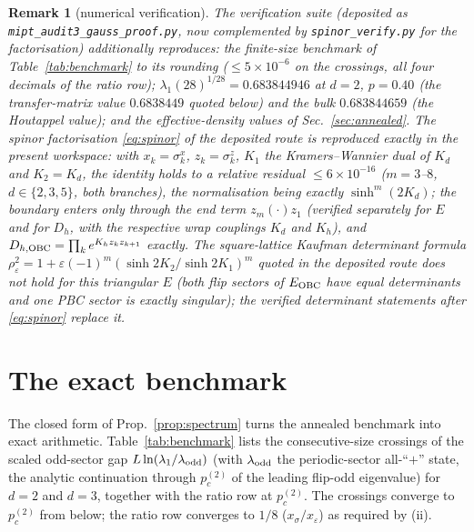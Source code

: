 \documentclass[11pt]{article}
\newtheorem{remark}{Remark}
\newcommand{\pctwo}{p_c^{(2)}}
\begin{document}
\begin{remark}[numerical verification]\label{rem:verification}
The verification suite (deposited as \texttt{mipt\_audit3\_gauss\_proof.py},
now complemented by \texttt{spinor\_verify.py} for the factorisation)
additionally reproduces: the finite-size benchmark of
Table~\ref{tab:benchmark} to its rounding ($\le5\times10^{-6}$ on the
crossings, all four decimals of the ratio row);
$\lambda_1(28)^{1/28}=0.683844946$ at $d=2$, $p=0.40$ (the transfer-matrix
value $0.6838449$ quoted below) and the bulk $0.683844659$ (the Houtappel
value); and the effective-density values of Sec.~\ref{sec:annealed}.  The
spinor factorisation \eqref{eq:spinor} of the deposited route is reproduced
exactly in the present workspace: with $x_k=\sigma^x_k$, $z_k=\sigma^z_k$,
$K_1$ the Kramers--Wannier dual of $K_d$ and $K_2=K_d$, the identity holds
to a relative residual $\le6\times10^{-16}$ ($m=3$--$8$, $d\in\{2,3,5\}$,
both branches), the normalisation being exactly $\sinh^m(2K_d)$; the
boundary enters only through the end term $z_m(\cdot)z_1$ (verified
separately for $E$ and for $D_h$, with the respective wrap couplings $K_d$
and $K_h$), and $D_{h,\rm OBC}=\prod_k e^{K_hz_kz_{k+1}}$ exactly.  The
square-lattice Kaufman determinant formula
$\rho_\varepsilon^2=1+\varepsilon(-1)^m(\sinh2K_2/\sinh2K_1)^m$ quoted in
the deposited route does not hold for this triangular $E$ (both flip
sectors of $E_{\rm OBC}$ have equal determinants and one PBC sector is
exactly singular); the verified determinant statements after
\eqref{eq:spinor} replace it.
\end{remark}

\section{The exact benchmark}\label{sec:benchmark}

The closed form of Prop.~\ref{prop:spectrum} turns the annealed benchmark
into exact arithmetic.  Table~\ref{tab:benchmark} lists the consecutive-size
crossings of the scaled odd-sector gap $L\ln(\lambda_1/\lambda_{\rm odd})$
(with $\lambda_{\rm odd}$ the periodic-sector all-``$+$'' state, the analytic
continuation through $\pctwo$ of the leading flip-odd eigenvalue) for
$d=2$ and $d=3$, together with the ratio row at $\pctwo$.  The crossings
converge to $\pctwo$ from below; the ratio row converges to $1/8$
($x_\sigma/x_\varepsilon$) as required by (ii).
\end{document}
